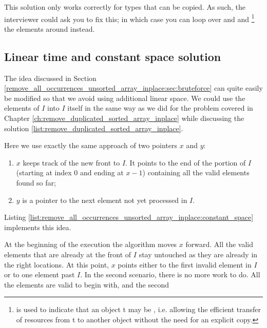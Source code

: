 This solution only works correctly for types that can be copied. As such, the interviewer could
 ask you to fix this; in which case you can loop over 
 and 
 and
\href{https://en.cppreference.com/w/cpp/utility/move}{
}\footnote{
 is used to indicate that an object t may be , i.e. allowing the efficient transfer of resources from t to another object without the need for an explicit copy.}
 the elements around instead.



\subsection{Linear time and constant space solution}
\label{remove_all_occurrences_unsorted_array_inplace:sec:constant_space}

The idea discussed in Section \ref{remove_all_occurrences_unsorted_array_inplace:sec:bruteforce} can quite easily be modified so that we avoid using additional linear
space. We could use  the elements of $I$ into $I$ itself in the same way as we did for the problem covered in Chapter \ref{ch:remove_duplicated_sorted_array_inplace}
while discussing the solution \ref{list:remove_duplicated_sorted_array_inplace}. 

Here we use exactly the same approach of two pointers $x$ and $y$:
\begin{enumerate}
	\item  $x$ keeps track of the new front to $I$. It points to the end of the portion of $I$ (starting at index $0$ and ending at $x-1$) containing all the valid elements found so far;
	\item $y$ is a pointer to the next element not yet processed in $I$.
\end{enumerate}

Listing \ref{list:remove_all_occurrences_unsorted_array_inplace:constant_space} implements this idea.





At the beginning of the execution the algorithm moves $x$ forward. All the valid elements that are already
at the front of $I$ stay untouched as they are already in the right locations.
At this point, $x$ points either to the first invalid element in $I$ or to one element past $I$.
In the second scenario, there is no more work to do. All the elements are valid to begin with, and the second 

